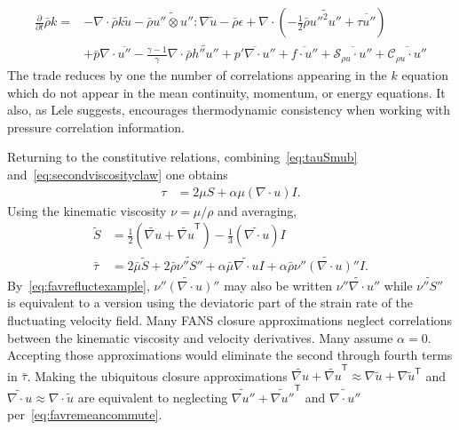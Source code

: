 \documentclass[letterpaper,11pt,nointlimits,reqno,draft]{amsbook}
\newcommand{\trans}[1]{{#1}^{\ensuremath{\mathsf{T}}}}
\newcommand{\Ssd}{\ensuremath{\mathcal{S}}} %
\newcommand{\Cs}{\ensuremath{\mathcal{C}}}  %
\begin{document}
\begin{align}
\label{eq:fanstke}
    \frac{\partial{}}{\partial{}t}\bar{\rho}k
 =
 &- \nabla\cdot\bar{\rho}k\tilde{u}
  - \bar{\rho} \widetilde{u''\otimes{}u''} : \nabla\tilde{u}
  - \bar{\rho} \epsilon
  + \nabla\cdot\left(
        -\frac{1}{2}\bar{\rho}\widetilde{{u''}^{2}u''}
      + \overline{\tau{}u''}
    \right)
\\
 &+ \bar{p}\nabla\cdot\overline{u''}
  - \frac{\gamma-1}{\gamma} \nabla\cdot\bar{\rho} \widetilde{h''u''}
  + \overline{p' \nabla\cdot{}u''}
  + \overline{f\cdot{}u''}
  + \overline{\Ssd_{\rho{} u}\cdot{}u''}
  + \overline{\Cs_{\rho{} u}\cdot{}u''}
\end{align}
The trade reduces by one the number of correlations appearing in the $k$
equation which do not appear in the mean continuity, momentum, or energy
equations.  It also, as Lele suggests, encourages thermodynamic consistency
when working with pressure correlation information.

Returning to the constitutive relations, combining~\eqref{eq:tauSmub}
and~\eqref{eq:secondviscosityclaw} one obtains
\begin{align}
  \tau
&= 2 \mu{} S + \alpha \mu \left( \nabla\cdot{}u \right) I.
\end{align}
Using the kinematic viscosity $\nu = \mu / \rho$ and averaging,
\begin{align}
   \tilde{S}
&=
     \frac{1}{2}\left(
       \widetilde{\nabla{}u} + \trans{\widetilde{\nabla{}u}}
     \right)
   - \frac{1}{3}\left(\widetilde{\nabla\cdot{}u}\right) I
\\
  \bar{\tau}
&=
    2 \bar{\mu}\tilde{S}
  + 2 \bar{\rho} \widetilde{\nu''S''}
  + \alpha \bar{\mu} \widetilde{\nabla\cdot{}u} I
  + \alpha \bar{\rho} \widetilde{\nu''\left(\nabla\cdot{}u\right)''} I
.
\end{align}
By~\eqref{eq:favrefluctexample},
$\widetilde{\nu''\left(\nabla\cdot{}u\right)''}$ may also be written
$\widetilde{\nu''\nabla\cdot{}u''}$ while $\widetilde{\nu''S''}$ is equivalent
to a version using the deviatoric part of the strain rate of the fluctuating
velocity field.  Many FANS closure approximations neglect correlations between
the kinematic viscosity and velocity derivatives.  Many assume $\alpha=0$.
Accepting those approximations would eliminate the second through fourth terms
in $\bar{\tau}$.  Making the ubiquitous closure approximations
$\widetilde{\nabla{}u} + \trans{\widetilde{\nabla{}u}} \approx \nabla\tilde{u}
+ \trans{\nabla\tilde{u}}$ and
$\widetilde{\nabla{}\cdot{}u}\approx\nabla\cdot\tilde{u}$ are equivalent to
neglecting $\widetilde{\nabla{}u''} + \trans{\widetilde{\nabla{}u''}}$ and
$\widetilde{\nabla{}\cdot{}u''}$ per~\eqref{eq:favremeancommute}.
\end{document}
